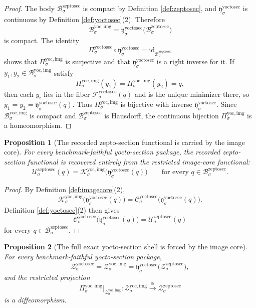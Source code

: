 \documentclass[11pt]{article}
\newcommand{\ZeptoSectionBody}[1]{\mathcal B_{#1}^{\mathrm{zeptosec}}}
\newcommand{\ZeptoSectionFunctional}[1]{\mathscr U_{#1}^{\mathrm{zeptosec}}}
\newcommand{\ZeptoSectionShell}[1]{\mathcal Z_{#1}^{\mathrm{zeptosec}}}
\newcommand{\YoctoSectionProj}[1]{\Pi_{#1}^{\mathrm{yoctosec}}}
\newcommand{\YoctoSectionFiber}[2]{\mathcal F_{#1}^{\mathrm{yoctosec}}(#2)}
\newcommand{\YoctoSectionZeptoMin}[1]{\mathfrak y_{#1}^{\mathrm{yoctosec}}}
\newcommand{\YoctoSectionFunctional}[1]{\mathscr C_{#1}^{\mathrm{yoctosec}}}
\newcommand{\YoctoSectionShell}[1]{\mathcal Z_{#1}^{\mathrm{yoctosec}}}
\newcommand{\YoctoImgBody}[1]{\mathcal B_{#1}^{\mathrm{yoc,img}}}
\newcommand{\YoctoImgProj}[1]{\Pi_{#1}^{\mathrm{yoc,img}}}
\newcommand{\YoctoImgFunctional}[1]{\mathscr K_{#1}^{\mathrm{yoc,img}}}
\newcommand{\YoctoImgShell}[1]{\mathcal Z_{#1}^{\mathrm{yoc,img}}}
\newtheorem{proposition}{Proposition}
\begin{document}
\begin{proof}
The body \(\ZeptoSectionBody{\sigma}\) is compact by Definition \ref{def:zeptosec}, and \(\YoctoSectionZeptoMin{\sigma}\) is continuous by Definition \ref{def:yoctosec}(2). Therefore
\[
\YoctoImgBody{\sigma}
=
\YoctoSectionZeptoMin{\sigma}\bigl(\ZeptoSectionBody{\sigma}\bigr)
\]
is compact. The identity
\[
\YoctoSectionProj{\sigma}\circ\YoctoSectionZeptoMin{\sigma}
=
\mathrm{id}_{\ZeptoSectionBody{\sigma}}
\]
shows that \(\YoctoImgProj{\sigma}\) is surjective and that \(\YoctoSectionZeptoMin{\sigma}\) is a right inverse for it. If \(y_{1},y_{2}\in\YoctoImgBody{\sigma}\) satisfy
\[
\YoctoImgProj{\sigma}(y_{1})=\YoctoImgProj{\sigma}(y_{2})=q,
\]
then each \(y_{i}\) lies in the fiber \(\YoctoSectionFiber{\sigma}{q}\) and is the unique minimizer there, so \(y_{1}=y_{2}=\YoctoSectionZeptoMin{\sigma}(q)\). Thus \(\YoctoImgProj{\sigma}\) is bijective with inverse \(\YoctoSectionZeptoMin{\sigma}\). Since \(\YoctoImgBody{\sigma}\) is compact and \(\ZeptoSectionBody{\sigma}\) is Hausdorff, the continuous bijection \(\YoctoImgProj{\sigma}\) is a homeomorphism.
\end{proof}

\begin{proposition}[The recorded zepto-section functional is carried by the image core]
\label{prop:functional}
For every benchmark-faithful yocto-section package, the recorded zepto-section functional is recovered entirely from the restricted image-core functional:
\[
\ZeptoSectionFunctional{\sigma}(q)
=
\YoctoImgFunctional{\sigma}\bigl(\YoctoSectionZeptoMin{\sigma}(q)\bigr)
\qquad
\text{for every }q\in\ZeptoSectionBody{\sigma}.
\]
\end{proposition}

\begin{proof}
By Definition \ref{def:imagecore}(2),
\[
\YoctoImgFunctional{\sigma}\bigl(\YoctoSectionZeptoMin{\sigma}(q)\bigr)
=
\YoctoSectionFunctional{\sigma}\bigl(\YoctoSectionZeptoMin{\sigma}(q)\bigr).
\]
Definition \ref{def:yoctosec}(2) then gives
\[
\YoctoSectionFunctional{\sigma}\bigl(\YoctoSectionZeptoMin{\sigma}(q)\bigr)
=
\ZeptoSectionFunctional{\sigma}(q)
\]
for every \(q\in\ZeptoSectionBody{\sigma}\).
\end{proof}

\begin{proposition}[The full exact yocto-section shell is forced by the image core]
\label{prop:shell}
For every benchmark-faithful yocto-section package,
\[
\YoctoSectionShell{\sigma}
=
\YoctoImgShell{\sigma}
=
\YoctoSectionZeptoMin{\sigma}\bigl(\ZeptoSectionShell{\sigma}\bigr),
\]
and the restricted projection
\[
\YoctoImgProj{\sigma}\big|_{\YoctoImgShell{\sigma}}
:
\YoctoImgShell{\sigma}\xrightarrow{\cong}\ZeptoSectionShell{\sigma}
\]
is a diffeomorphism.
\end{proposition}
\end{document}
